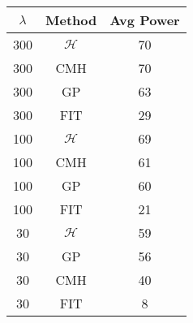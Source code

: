 \centering \begin{tabular}{c|c|c}
$\lambda$	&Method	&Avg Power\\\hline
300	&$\mathcal{H}$	&70\\
300	&CMH	&70\\
300	&GP	&63\\
300	&FIT	&29\\
100	&$\mathcal{H}$	&69\\
100	&CMH	&61\\
100	&GP	&60\\
100	&FIT	&21\\
30	&$\mathcal{H}$	&59\\
30	&GP	&56\\
30	&CMH	&40\\
30	&FIT	&8\\
\end{tabular}
